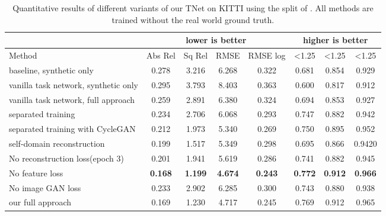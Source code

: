 \documentclass[runningheads]{llncs}
\begin{document}
\begin{table}[tb!]
	\begin{center}
		\scriptsize
		\renewcommand{\arraystretch}{1.4}
		\setlength{\arrayrulewidth}{1.0pt}
		\caption{Quantitative results of different variants of our TNet on KITTI using the split of \cite{eigen2014depth}. All methods are trained without the real world ground truth.}
		\begin{tabular}{|l|c|c|c|c|c|c|c|}
			\hline
			\multicolumn{1}{|c|}{} &  \multicolumn{4}{c|}{\cellcolor[rgb]{0.6,0.8,1.0} lower is better} &  \multicolumn{3}{c|}{\cellcolor[rgb]{0.0,0.8,1.0} higher is better} \\
			\hline
			Method & \cellcolor[rgb]{0.6,0.8,1.0} {\tiny Abs Rel} & \cellcolor[rgb]{0.6,0.8,1.0} {\tiny Sq Rel} & \cellcolor[rgb]{0.6,0.8,1.0} {\tiny RMSE} & \cellcolor[rgb]{0.6,0.8,1.0} {\tiny RMSE log} & \cellcolor[rgb]{0.0,0.8,1.0} {\tiny <1.25} & \cellcolor[rgb]{0.0,0.8,1.0} {\tiny <1.25}  & \cellcolor[rgb]{0.0,0.8,1.0} {\tiny <1.25} \\
			\hline
			baseline, synthetic only & 0.278 & 3.216 & 6.268 & 0.322 & 0.681 & 0.854 & 0.929 \\
			vanilla task network, synthetic only & 0.295 & 3.793 & 8.403 & 0.363 & 0.600 & 0.817 & 0.912 \\
			vanilla task network, full approach & 0.259 & 2.891 & 6.380 & 0.324 & 0.694 & 0.853 & 0.927\\
			\hline
			separated training & 0.234 & 2.706 & 6.068 & 0.293 & 0.747 & 0.882 & 0.942 \\
			separated training with CycleGAN & 0.212 & 1.973 &  5.340 & 0.269 & 0.750 & 0.895 & 0.952\\
			self-domain reconstruction &  0.199 & 1.517 & 5.349 & 0.298 & 0.695 & 0.866 & 0.9420 \\
			\hline
			No reconstruction loss(epoch 3)& 0.201 & 1.941 & 5.619 & 0.286 & 0.741 & 0.882 & 0.945 \\
			No feature loss & {\bf 0.168} & {\bf 1.199} & {\bf 4.674} & {\bf 0.243} & {\bf 0.772} & {\bf 0.912}& {\bf 0.966}\\
			No image GAN loss & 0.233 & 2.902 & 6.285 & 0.300 & 0.743 & 0.880 & 0.938 \\
			\hline
			our full approach & 0.169 & 1.230 & 4.717& 0.245 & 0.769 &    0.912 &   0.965 \\
			\hline
		\end{tabular}
		\label{table:ablation}
	\end{center}
\end{table}
\end{document}
